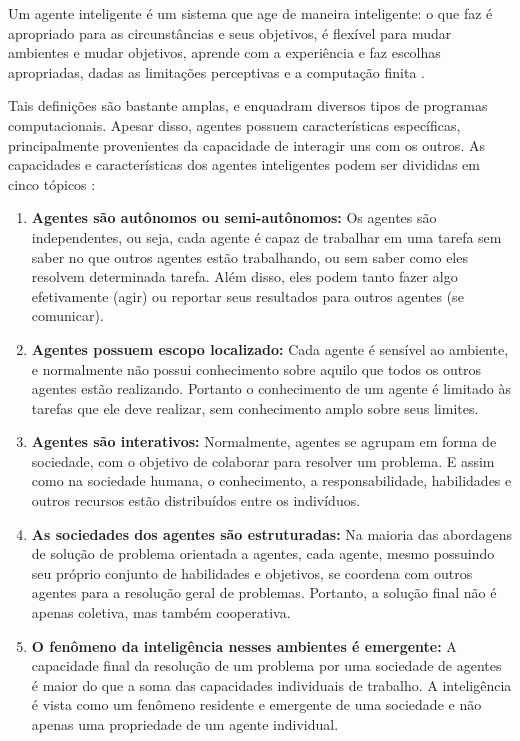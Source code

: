 \begin{displayquote}
    Um agente inteligente é um sistema que age de maneira inteligente: o que faz é apropriado para as circunstâncias e seus objetivos, é flexível para mudar ambientes e mudar objetivos, aprende com a experiência e faz escolhas apropriadas, dadas as limitações perceptivas e a computação finita \cite{poole1998computational}.
\end{displayquote}

Tais definições são bastante amplas, e enquadram diversos tipos de programas computacionais. Apesar disso, agentes possuem características específicas, principalmente provenientes da capacidade de interagir uns com os outros. As capacidades e características dos agentes inteligentes podem ser divididas em cinco tópicos \cite{lugerBook6th}: 

\begin{enumerate}
    \item \textbf{Agentes são autônomos ou semi-autônomos:} Os agentes são independentes, ou seja, cada agente é capaz de trabalhar em uma tarefa sem saber no que outros agentes estão trabalhando, ou sem saber como eles resolvem determinada tarefa. Além disso, eles podem tanto fazer algo efetivamente (agir) ou reportar seus resultados para outros agentes (se comunicar).
    \item \textbf{Agentes possuem escopo localizado:} Cada agente é sensível ao ambiente, e normalmente não possui conhecimento sobre aquilo que todos os outros agentes estão realizando. Portanto o conhecimento de um agente é limitado às tarefas que ele deve realizar, sem conhecimento amplo sobre seus limites.
    \item \textbf{Agentes são interativos:} Normalmente, agentes se agrupam em forma de sociedade, com o objetivo de colaborar para resolver um problema. E assim como na sociedade humana, o conhecimento, a responsabilidade, habilidades e outros recursos estão distribuídos entre os indivíduos.
    \item \textbf{As sociedades dos agentes são estruturadas:} Na maioria das abordagens de solução de problema orientada a agentes, cada agente, mesmo possuindo seu próprio conjunto de habilidades e objetivos, se coordena com outros agentes para a resolução geral de problemas. Portanto, a solução final não é apenas coletiva, mas também cooperativa.
    \item \textbf{O fenômeno da inteligência nesses ambientes é emergente:} A capacidade final da resolução de um problema por uma sociedade de agentes é maior do que a soma das capacidades individuais de trabalho. A inteligência é vista como um fenômeno residente e emergente de uma sociedade e não apenas uma propriedade de um agente individual.
    
\end{enumerate}

